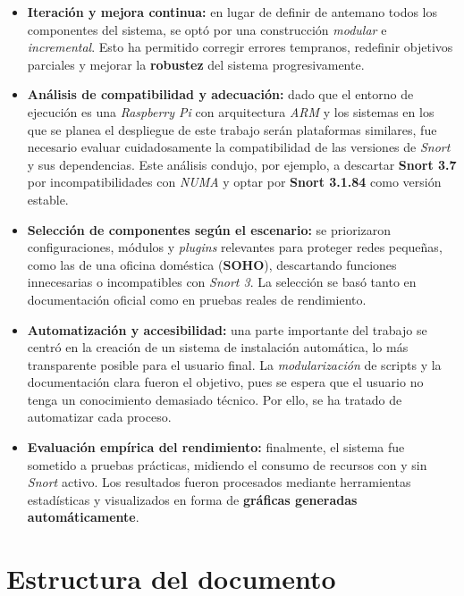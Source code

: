 \documentclass[11pt,a4paper,twoside]{report}
\begin{document}
\begin{itemize}
	\item \textbf{Iteración y mejora continua:} en lugar de definir de antemano todos los componentes del sistema, se optó por una construcción \textit{modular} e \textit{incremental}. Esto ha permitido corregir errores tempranos, redefinir objetivos parciales y mejorar la \textbf{robustez} del sistema progresivamente.
	
	\item \textbf{Análisis de compatibilidad y adecuación:} dado que el entorno de ejecución es una \textit{Raspberry Pi} con arquitectura \textit{ARM} y los sistemas en los que se planea el despliegue de este trabajo serán plataformas similares, fue necesario evaluar cuidadosamente la compatibilidad de las versiones de \textit{Snort} y sus dependencias. Este análisis condujo, por ejemplo, a descartar \textbf{Snort 3.7} por incompatibilidades con \textit{NUMA} y optar por \textbf{Snort 3.1.84} como versión estable.
	
	\item \textbf{Selección de componentes según el escenario:} se priorizaron configuraciones, módulos y \textit{plugins} relevantes para proteger redes pequeñas, como las de una oficina doméstica (\textbf{SOHO}), descartando funciones innecesarias o incompatibles con \textit{Snort 3}. La selección se basó tanto en documentación oficial como en pruebas reales de rendimiento.
	
	\item \textbf{Automatización y accesibilidad:} una parte importante del trabajo se centró en la creación de un sistema de instalación automática, lo más transparente posible para el usuario final. La \textit{modularización} de scripts y la documentación clara fueron el objetivo, pues se espera que el usuario no tenga un conocimiento demasiado técnico. Por ello, se ha tratado de automatizar cada proceso.
	
	\item \textbf{Evaluación empírica del rendimiento:} finalmente, el sistema fue sometido a pruebas prácticas, midiendo el consumo de recursos con y sin \textit{Snort} activo. Los resultados fueron procesados mediante herramientas estadísticas y visualizados en forma de \textbf{gráficas generadas automáticamente}.
\end{itemize}

\pagebreak

\section*{Estructura del documento}
\end{document}
